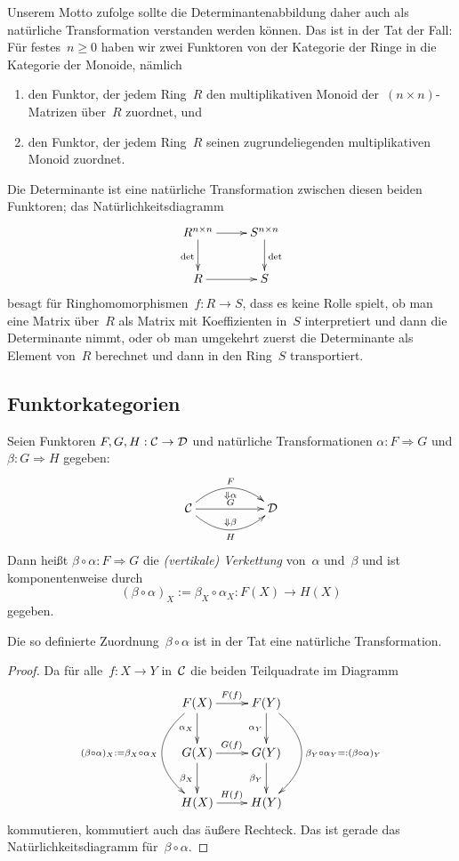 Unserem Motto zufolge sollte die Determinantenabbildung daher
auch als natürliche Transformation verstanden werden können. Das ist in der Tat
der Fall: Für festes~$n \geq 0$ haben wir zwei Funktoren von der Kategorie der
Ringe in die Kategorie der Monoide, nämlich
\begin{enumerate}
\item den Funktor, der jedem Ring~$R$ den multiplikativen Monoid der~$(n \times
n)$-Matrizen über~$R$ zuordnet, und
\item den Funktor, der jedem Ring~$R$ seinen zugrundeliegenden multiplikativen
Monoid zuordnet.
\end{enumerate}
Die Determinante ist eine natürliche Transformation zwischen diesen beiden
Funktoren; das Natürlichkeitsdiagramm
\[ \xymatrix{
  R^{n \times n} \ar[r] \ar[d]_\det & S^{n \times n} \ar[d]^\det \\
  R \ar[r] & S
} \]
besagt für Ringhomomorphismen~$f : R \to S$, dass es keine Rolle spielt, ob man
eine Matrix über~$R$ als Matrix mit Koeffizienten in~$S$ interpretiert und dann
die Determinante nimmt, oder ob man umgekehrt zuerst die Determinante als
Element von~$R$ berechnet und dann in den Ring~$S$ transportiert.


\subsection{Funktorkategorien}

\begin{defn}
Seien Funktoren $F,G,H: \mathcal{C} \to \mathcal{D}$ und natürliche Transformationen $\alpha: F
\Rightarrow G$ und $\beta: G \Rightarrow H$ gegeben:
\[ \xymatrix{\C \ar@/^1.7em/[rr]^F_{\Downarrow \alpha} \ar[rr]^G \ar@/_1.7em/[rr]^{\Downarrow \beta}_H & & \D} \]
Dann heißt $\beta \circ \alpha:F \Rightarrow G$ die \emph{(vertikale)
Verkettung} von~$\alpha$ und~$\beta$ und ist komponentenweise durch
\[ (\beta \circ \alpha)_X := \beta_X \circ \alpha_X : F(X) \to H(X) \]
gegeben.
\end{defn}

\begin{prop}Die so definierte Zuordnung~$\beta \circ \alpha$ ist in der Tat
eine natürliche Transformation.\end{prop}
\begin{proof}Da für alle~$f:X \to Y$ in~$\mathcal{C}$ die beiden Teilquadrate
im Diagramm
\[ \xymatrix{
  F(X) \ar[r]^{F(f)} \ar[d]_{\alpha_X} \ar@/_ 1cm/[dd]_{(\beta \circ \alpha)_X := \beta_X \circ \alpha_X} & F(Y) \ar[d]_{\alpha_Y} \ar@/^ 1cm/[dd]^{\beta_Y \circ \alpha_Y =: (\beta \circ \alpha)_Y} \\
  G(X) \ar[r]^{G(f)} \ar[d]_{\beta_X} & G(Y) \ar[d]_{\beta_Y} \\
  H(X) \ar[r]^{H(f)} & H(Y)
} \]
kommutieren, kommutiert auch das äußere Rechteck. Das ist gerade das
Natür\-lich\-keits\-dia\-gramm für~$\beta\circ\alpha$.
\end{proof}

